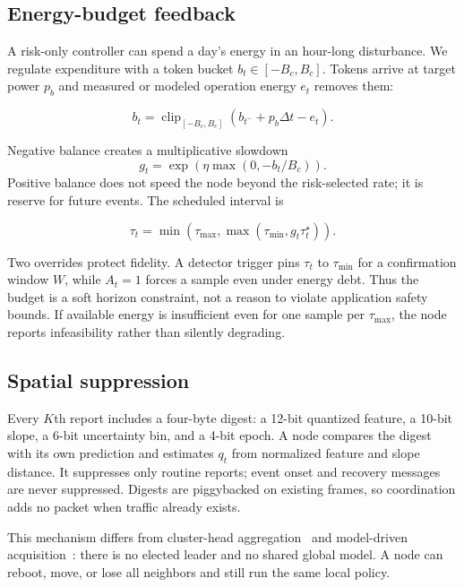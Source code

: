 \subsection{Energy-budget feedback}
\label{sec:budget}

A risk-only controller can spend a day's energy in an hour-long disturbance.
We regulate expenditure with a token bucket $b_t\in[-B_c,B_c]$.  Tokens arrive
at target power $p_b$ and measured or modeled operation energy $e_t$ removes
them:

\begin{equation}
\label{eq:bucket}
b_t=\operatorname{clip}_{[-B_c,B_c]}
\left(b_{t^-}+p_b\Delta t-e_t\right).
\end{equation}

Negative balance creates a multiplicative slowdown
\[
  g_t=\exp\!\left(\eta\max(0,-b_t/B_c)\right).
\]
Positive balance does not speed the node
beyond the risk-selected rate; it is reserve for future events.  The scheduled
interval is

\begin{equation}
\label{eq:finalinterval}
\tau_t=\min\!\left(\tau_{\max},
\max\!\left(\tau_{\min},g_t\tau_t^{\star}\right)\right).
\end{equation}

Two overrides protect fidelity.  A detector trigger pins $\tau_t$ to
$\tau_{\min}$ for a confirmation window $W$, while $A_t=1$ forces a sample even
under energy debt.  Thus the budget is a soft horizon constraint, not a reason
to violate application safety bounds.  If available energy is insufficient
even for one sample per $\tau_{\max}$, the node reports infeasibility rather
than silently degrading.

\subsection{Spatial suppression}

Every $K$th report includes a four-byte digest: a 12-bit quantized feature, a
10-bit slope, a 6-bit uncertainty bin, and a 4-bit epoch.  A node compares the
digest with its own prediction and estimates $q_t$ from normalized feature and
slope distance.  It suppresses only routine reports; event onset and recovery
messages are never suppressed.  Digests are piggybacked on existing frames, so
coordination adds no packet when traffic already exists.

This mechanism differs from cluster-head aggregation~\cite{heinzelman2000energy}
and model-driven acquisition~\cite{deshpande2004model}: there is no elected
leader and no shared global model.  A node can reboot, move, or lose all
neighbors and still run the same local policy.

